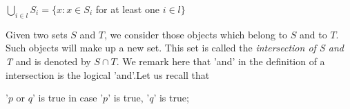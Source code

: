 \documentclass{article}
\begin{document}
    \begin{center}
        $\bigcup\limits_{i\in l}^{} S_{i} = \{x:x\in S_{i}$ for at least one $i \in l \}$ 
    \end{center}
    Given two sets $S$ and $T$, we consider those objects which belong to $S$ and to $T$. Such objects will make up a new set. This set is called the \textit{intersection of S and T} and is denoted by $S \cap T$. We remark here that 'and' in the definition of a intersection is the logical 'and'.Let us recall that 
    \begin{center}
        '$p$ or $q$' is true in case '$p$' is true, '$q$' is true;
    \end{center}
\end{document}

